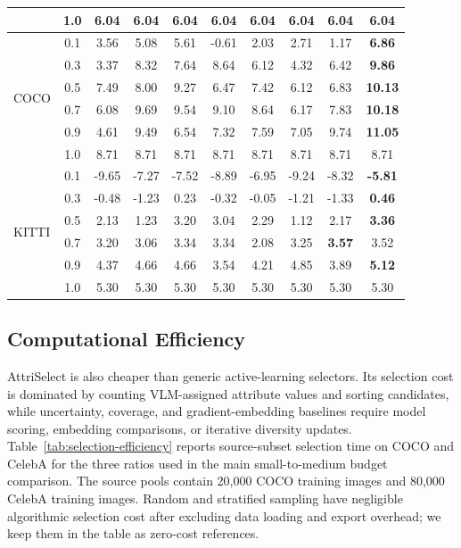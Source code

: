 \documentclass{article}
\newcommand{\model}{AttriSelect\xspace}
\begin{document}
\begin{table}[t]
\begin{tabular}{l c c c c c c c c c}
& 1.0 & 6.04 & 6.04 & 6.04 & 6.04 & 6.04 & 6.04 & 6.04 & 6.04 \\
\midrule
\multirow{6}{*}{COCO}
& 0.1 & 3.56 & 5.08 & 5.61 & -0.61 & 2.03 & 2.71 & 1.17 & \textbf{6.86} \\
& 0.3 & 3.37 & 8.32 & 7.64 & 8.64 & 6.12 & 4.32 & 6.42 & \textbf{9.86} \\
& 0.5 & 7.49 & 8.00 & 9.27 & 6.47 & 7.42 & 6.12 & 6.83 & \textbf{10.13} \\
& 0.7 & 6.08 & 9.69 & 9.54 & 9.10 & 8.64 & 6.17 & 7.83 & \textbf{10.18} \\
& 0.9 & 4.61 & 9.49 & 6.54 & 7.32 & 7.59 & 7.05 & 9.74 & \textbf{11.05} \\
& 1.0 & 8.71 & 8.71 & 8.71 & 8.71 & 8.71 & 8.71 & 8.71 & 8.71 \\
\midrule
\multirow{6}{*}{KITTI}
& 0.1 & -9.65 & -7.27 & -7.52 & -8.89 & -6.95 & -9.24 & -8.32 & \textbf{-5.81} \\
& 0.3 & -0.48 & -1.23 & 0.23 & -0.32 & -0.05 & -1.21 & -1.33 & \textbf{0.46} \\
& 0.5 & 2.13 & 1.23 & 3.20 & 3.04 & 2.29 & 1.12 & 2.17 & \textbf{3.36} \\
& 0.7 & 3.20 & 3.06 & 3.34 & 3.34 & 2.08 & 3.25 & \textbf{3.57} & 3.52 \\
& 0.9 & 4.37 & 4.66 & 4.66 & 3.54 & 4.21 & 4.85 & 3.89 & \textbf{5.12} \\
& 1.0 & 5.30 & 5.30 & 5.30 & 5.30 & 5.30 & 5.30 & 5.30 & 5.30 \\
\bottomrule
\end{tabular}
\end{table}

\subsection{Computational Efficiency}

\model is also cheaper than generic active-learning selectors. Its
selection cost is dominated by counting VLM-assigned attribute values and
sorting candidates, while uncertainty, coverage, and gradient-embedding
baselines require model scoring, embedding comparisons, or iterative diversity
updates. Table~\ref{tab:selection-efficiency} reports source-subset selection
time on COCO and CelebA for the three ratios used in the main small-to-medium
budget comparison. The source pools contain 20,000 COCO training images and
80,000 CelebA training images. Random and stratified sampling have negligible
algorithmic selection cost after excluding data loading and export overhead;
we keep them in the table as zero-cost references.
\end{document}

